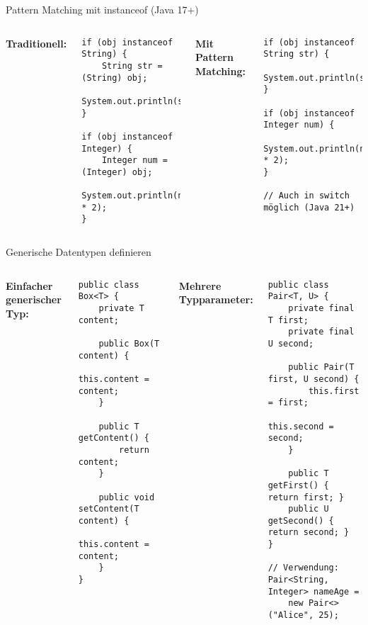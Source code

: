 \begin{frame}[fragile]{Pattern Matching mit instanceof (Java 17+)}
  \begin{columns}[T]
    \textbf{Traditionell:}
    \begin{lstlisting}[style=java, basicstyle=\footnotesize\ttfamily]
if (obj instanceof String) {
    String str = (String) obj;
    System.out.println(str.toUpperCase());
}

if (obj instanceof Integer) {
    Integer num = (Integer) obj;
    System.out.println(num * 2);
}
    \end{lstlisting}

    \textbf{Mit Pattern Matching:}
    \begin{lstlisting}[style=java, basicstyle=\footnotesize\ttfamily]
if (obj instanceof String str) {
    System.out.println(str.toUpperCase());
}

if (obj instanceof Integer num) {
    System.out.println(num * 2);
}

// Auch in switch möglich (Java 21+)
    \end{lstlisting}
  \end{columns}
\end{frame}

\begin{frame}[fragile]{Generische Datentypen definieren}
  \begin{columns}[T]
    \textbf{Einfacher generischer Typ:}
    \begin{lstlisting}[style=java, basicstyle=\scriptsize\ttfamily]
public class Box<T> {
    private T content;

    public Box(T content) {
        this.content = content;
    }

    public T getContent() {
        return content;
    }

    public void setContent(T content) {
        this.content = content;
    }
}
    \end{lstlisting}

    \textbf{Mehrere Typparameter:}
    \begin{lstlisting}[style=java, basicstyle=\scriptsize\ttfamily]
public class Pair<T, U> {
    private final T first;
    private final U second;

    public Pair(T first, U second) {
        this.first = first;
        this.second = second;
    }

    public T getFirst() { return first; }
    public U getSecond() { return second; }
}

// Verwendung:
Pair<String, Integer> nameAge =
    new Pair<>("Alice", 25);
    \end{lstlisting}
  \end{columns}
\end{frame}

